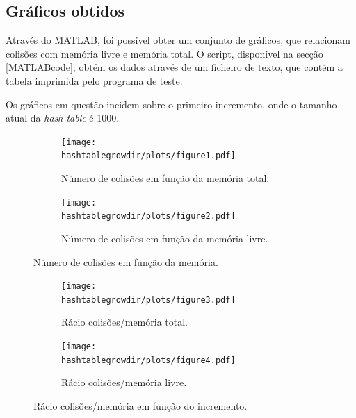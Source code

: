 \documentclass[portuguese,11pt,a4paper,titlepage]{article}
\newcommand{\srcdir}{..}
\newcommand{\hashtablegrowdir}{\srcdir/hash\_table\_grow-test}
\begin{document}


\subsection{Gráficos obtidos}
Através do MATLAB, foi possível obter um conjunto de gráficos, que relacionam colisões com memória livre e memória total. O script, disponível na secção \ref{MATLABcode}, obtém os dados através de um ficheiro de texto, que contém a tabela imprimida pelo programa de teste.

Os gráficos em questão incidem sobre o primeiro incremento, onde o tamanho atual da \textit{hash table} é 1000.

\begin{figure}[h]
	\begin{subfigure}{0.47\textwidth}
		\texttt{[image: \\hashtablegrowdir/plots/figure1.pdf]} 
		\caption{Número de colisões em função da memória total.}
		\label{fig:htg_col_mem_total}
	\end{subfigure}
	\hspace{0.049\textwidth}
	\begin{subfigure}{0.47\textwidth}
		\texttt{[image: \\hashtablegrowdir/plots/figure2.pdf]}
		\caption{Número de colisões em função da memória livre.}
		\label{fig:htg_col_mem_free}
	\end{subfigure}
	
	\caption{Número de colisões em função da memória.}
	\label{fig:htg_col_mem}
\end{figure}

\begin{figure}[h]
	\begin{subfigure}{0.47\textwidth}
		\texttt{[image: \\hashtablegrowdir/plots/figure3.pdf]} 
		\caption{Rácio colisões/memória total.}
		\label{fig:htg_ratio_inc_total}
	\end{subfigure}
	\hspace{0.049\textwidth}
	\begin{subfigure}{0.47\textwidth}
		\texttt{[image: \\hashtablegrowdir/plots/figure4.pdf]}
		\caption{Rácio colisões/memória livre.}
		\label{fig:htg_ratio_inc_free}
	\end{subfigure}
	
	\caption{Rácio colisões/memória em função do incremento.}
	\label{fig:htg_ratio_inc}
\end{figure}
\end{document}

